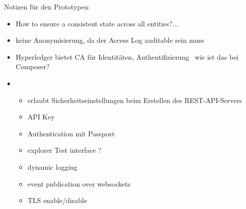    Notizen für den Prototypen:
    \begin{itemize}[noitemsep]
        \item How to ensure a consistent state across all entities?...
        \item keine Anonymisierung, da der Access Log auditable sein muss
        \item Hyperledger bietet CA für Identitäten, Authentifizierung \textrightarrow\ wie ist das bei Composer?
        \item \begin{itemize}
            \item erlaubt Sicherheitseinstellungen beim Erstellen des REST-API-Servers
            \item API Key
            \item Authentication mit Passport
            \item explorer Test interface ?
            \item dynamic logging
            \item event publication over websockets
            \item TLS enable/\-disable
        \end{itemize}
    \end{itemize}
    